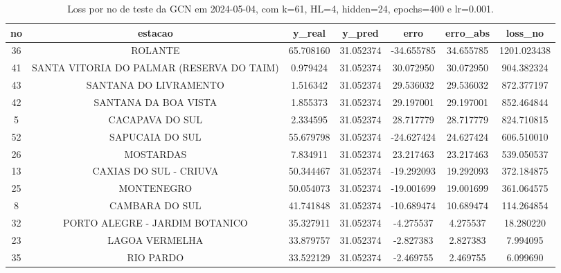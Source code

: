 \begin{table}[h]
\centering
\caption{Loss por no de teste da GCN em 2024-05-04, com k=61, HL=4, hidden=24, epochs=400 e lr=0.001.}
\label{tab:gcn_loss_k61_hl4_h24_e400_d20240504}
\begin{tabular}{ccccccc}
\toprule
no & estacao & y\_real & y\_pred & erro & erro\_abs & loss\_no \\
\midrule
36 & ROLANTE & 65.708160 & 31.052374 & -34.655785 & 34.655785 & 1201.023438 \\
41 & SANTA VITORIA DO PALMAR (RESERVA DO TAIM) & 0.979424 & 31.052374 & 30.072950 & 30.072950 & 904.382324 \\
43 & SANTANA DO LIVRAMENTO & 1.516342 & 31.052374 & 29.536032 & 29.536032 & 872.377197 \\
42 & SANTANA DA BOA VISTA & 1.855373 & 31.052374 & 29.197001 & 29.197001 & 852.464844 \\
5 & CACAPAVA DO SUL & 2.334595 & 31.052374 & 28.717779 & 28.717779 & 824.710815 \\
52 & SAPUCAIA DO SUL & 55.679798 & 31.052374 & -24.627424 & 24.627424 & 606.510010 \\
26 & MOSTARDAS & 7.834911 & 31.052374 & 23.217463 & 23.217463 & 539.050537 \\
13 & CAXIAS DO SUL - CRIUVA & 50.344467 & 31.052374 & -19.292093 & 19.292093 & 372.184875 \\
25 & MONTENEGRO & 50.054073 & 31.052374 & -19.001699 & 19.001699 & 361.064575 \\
8 & CAMBARA DO SUL & 41.741848 & 31.052374 & -10.689474 & 10.689474 & 114.264854 \\
32 & PORTO ALEGRE - JARDIM BOTANICO & 35.327911 & 31.052374 & -4.275537 & 4.275537 & 18.280220 \\
23 & LAGOA VERMELHA & 33.879757 & 31.052374 & -2.827383 & 2.827383 & 7.994095 \\
35 & RIO PARDO & 33.522129 & 31.052374 & -2.469755 & 2.469755 & 6.099690 \\
\bottomrule
\end{tabular}
\end{table}
